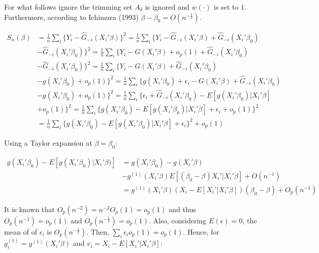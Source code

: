 \documentclass[a4paper]{article}
\newcommand{\norm}[1]{\left\lVert#1\right\rVert}
\begin{document}
For what follows ignore the trimming set $A_\delta$ is ignored and $w(\cdot)$ is set to 1. Furthermore, according to Ichimura (1993) $\beta - \beta_0 = O(n^{-\frac{1}{2}})$. 



\begin{align*}
S_{n}(\beta) & = \frac{1}{n}\sum_i \{ Y_i - \hat{G}_{-i}(X_i'\beta)\}^2 = \frac{1}{n}\sum_i\{Y_i - \hat{G}_{-i}(X_i'\beta) +  \hat{G}_{-i}(X_i'\beta_0) \\
			 & - \hat{G}_{-i}(X_i'\beta_0) \}^2 = \frac{1}{n} \sum_i \{Y_i - G(X_i'\beta) + o_p(1) + \hat{G}_{-i}(X_i'\beta_0) \\
			 & - \hat{G}_{-i}(X_i'\beta_0) \}^2 = \frac{1}{n}\sum_i \{ Y_i - G(X_i'\beta) + \hat{G}_{-i}(X_i'\beta_0) \\
			 & - g(X_i'\beta_0) + o_p(1) \}^2 = \frac{1}{n} \sum_i \{ g(X_i'\beta_0) + \epsilon_i - G(X_i'\beta) + \hat{G}_{-i}(X_i'\beta_0) \\
			 & - g(X_i'\beta_0) + o_p(1) \}^2 = \frac{1}{n} \sum_i \{ \epsilon_i + \hat{G}_{-i}(X_i'\beta_0) - E[g(X_i'\beta_0)|X_i'\beta] \\
			 & + o_p(1) \}^2 = \frac{1}{n}\sum_i \{ g(X_i'\beta_0) - E[g(X_i'\beta_0)|X_i'\beta] +  \epsilon_i + o_p(1)\}^2 \\
			 & = \frac{1}{n}\sum_i \{ g(X_i'\beta_0) - E[g(X_i'\beta_0)|X_i'\beta] +  \epsilon_i\}^2 + o_p(1)
\end{align*}

Using a Taylor expansion at $\beta = \beta_0$:

\begin{align*}
g(X_i'\beta_0) - E[g(X_i'\beta_0)|X_i'\beta)] & = g(X_i'\beta_0) - g(X_i'\beta) \\
											 & - g^{(1)}(X_i'\beta)E[(\beta_0 - \beta)X_i'|X_i'\beta] + O(n^{-1}) \\
				                              & = g^{(1)}(X_i'\beta)( X_i - E[X_i'|X_i'\beta])(\beta_0 - \beta) + O_p(n^{-1})
\end{align*}


It is known that $O_p(n^{-2}) = n^{-2}O_p(1) = o_p(1)$ and thus $O_p(n^{-1}) = o_p(1)$ and $O_p(n^{-\frac{1}{2}}) = o_p(1)$. Also, considering $E(\epsilon) = 0$, the mean of of $\epsilon_i$ is $O_p(n^{-\frac{1}{2}})$. Then, $\sum_i\epsilon_io_p(1) = o_p(1)$. Hence, for $g_{i}^{(1)} = g^{(1)}(X_i'\beta)$ and $v_i = X_i - E[X_i'|X_i'\beta]$:
\end{document}
